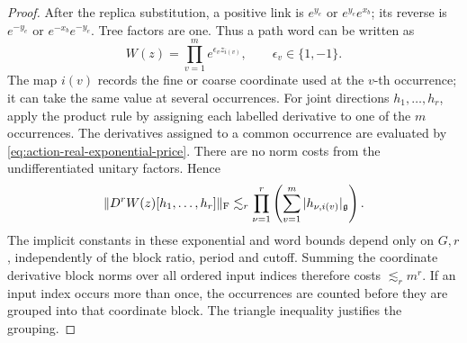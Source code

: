 \documentclass[11pt,reqno]{amsart}
\numberwithin{equation}{section}
\theoremstyle{definition}
\theoremstyle{remark}
\newcommand{\g}{\mathfrak g}
\begin{document}
\begin{proof}
After the replica substitution, a positive link is
\(e^{y_e}\) or \(e^{y_e}e^{x_b}\); its reverse is
\(e^{-y_e}\) or \(e^{-x_b}e^{-y_e}\). Tree factors are one.
Thus a path word can be written as
\[
       W(z)=\prod_{v=1}^{m}e^{\epsilon_vz_{i(v)}},
              \qquad \epsilon_v\in\{1,-1\}.
\]
The map \(i(v)\) records the fine or coarse coordinate used
at the \(v\)-th occurrence; it can take the same value at
several occurrences. For joint directions
\(h_1,\ldots,h_r\), apply the product rule by assigning
each labelled derivative to one of the \(m\) occurrences.
The derivatives assigned to a common occurrence are evaluated
by \eqref{eq:action-real-exponential-price}. There are no
norm costs from the undifferentiated unitary factors. Hence
\begin{equation}
 \|D^rW(z)[h_1,\ldots,h_r]\|_{\rm F}
   \lesssim_r\prod_{\nu=1}^r
                     \left(\sum_{v=1}^{m}|h_{\nu,i(v)}|_{\g}\right).
 \label{eq:action-word-direction-price}
\end{equation}
The implicit constants in these exponential and word bounds
depend only on \(G,r\), independently of the block ratio,
period and cutoff. Summing the coordinate derivative block
norms over all ordered input indices therefore costs
\(\lesssim_r m^r\). If an input index occurs more than once,
the occurrences are counted before they are grouped into
that coordinate block. The triangle inequality justifies
the grouping.


\end{proof}
\end{document}
